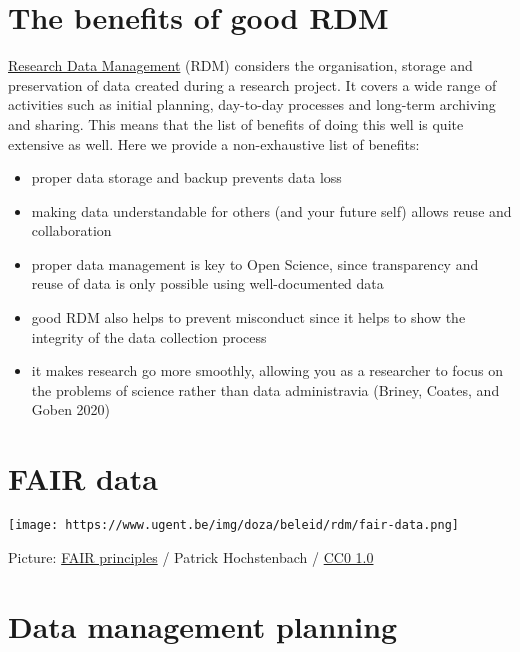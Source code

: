 \documentclass[
  letterpaper,
  DIV=11,
  numbers=noendperiod]{scrreprt}
\begin{document}
\hypertarget{the-benefits-of-good-rdm}{%
\chapter{The benefits of good RDM}\label{the-benefits-of-good-rdm}}

\href{https://the-turing-way.netlify.app/afterword/glossary.html\#term-Research-Data-Management}{Research
Data Management} (RDM) considers the organisation, storage and
preservation of data created during a research project. It covers a wide
range of activities such as initial planning, day-to-day processes and
long-term archiving and sharing. This means that the list of benefits of
doing this well is quite extensive as well. Here we provide a
non-exhaustive list of benefits:

\begin{itemize}
\item
  proper data storage and backup prevents data loss
\item
  making data understandable for others (and your future self) allows
  reuse and collaboration
\item
  proper data management is key to Open Science, since transparency and
  reuse of data is only possible using well-documented data
\item
  good RDM also helps to prevent misconduct since it helps to show the
  integrity of the data collection process
\item
  it makes research go more smoothly, allowing you as a researcher to
  focus on the problems of science rather than data administravia
  (Briney, Coates, and Goben 2020)
\end{itemize}

\hypertarget{fair-data}{%
\chapter{FAIR data}\label{fair-data}}

\texttt{[image: https://www.ugent.be/img/doza/beleid/rdm/fair-data.png]}

Picture: \href{https://www.ugent.be/img/doza/beleid/fair-data.png}{FAIR
principles} / Patrick Hochstenbach /
\href{https://creativecommons.org/publicdomain/zero/1.0/}{CC0 1.0}

\hypertarget{data-management-planning}{%
\chapter{Data management planning}\label{data-management-planning}}
\end{document}
